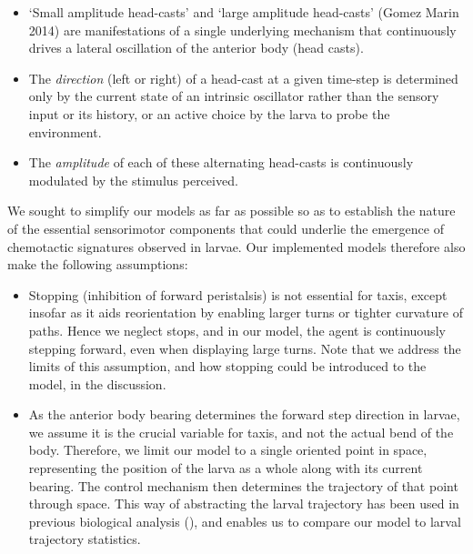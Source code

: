 \documentclass[11pt,a4paper]{article}
\begin{document}
\begin{itemize}

\item ‘Small amplitude head-casts’ and ‘large amplitude head-casts’ (Gomez Marin 2014) are manifestations of a single underlying mechanism that continuously drives a lateral oscillation of the anterior body (head casts). 

\item The {\it direction} (left or right) of a head-cast at a given time-step is determined only by the current state of an intrinsic oscillator rather than the sensory input or its history, or an active choice by the larva to probe the environment.

\item The {\it amplitude} of each of these alternating head-casts is continuously modulated by the stimulus perceived.

\end{itemize}

We sought to simplify our models as far as possible so as to establish the nature of the essential sensorimotor components that could underlie the emergence of chemotactic signatures observed in larvae. Our implemented models therefore also make the following assumptions:

\begin{itemize}

\item Stopping (inhibition of forward peristalsis) is not essential for taxis, except insofar as it aids reorientation by enabling larger turns or tighter curvature of paths. Hence we neglect stops, and in our model, the agent is continuously stepping forward, even when displaying large turns. Note that we address the limits of this assumption, and how stopping could be introduced to the model, in the discussion.

\item As the anterior body bearing determines the forward step direction in larvae, we assume it is the crucial variable for taxis, and not the actual bend of the body. Therefore, we limit our model to a single oriented point in space, representing the position of the larva as a whole along with its current bearing. The control mechanism then determines the trajectory of that point through space. 
This way of abstracting the larval trajectory has been used in previous biological analysis (\citep{louis2008bilateral}), and enables us to compare our model to larval trajectory statistics. 

\end{itemize}
\end{document}

